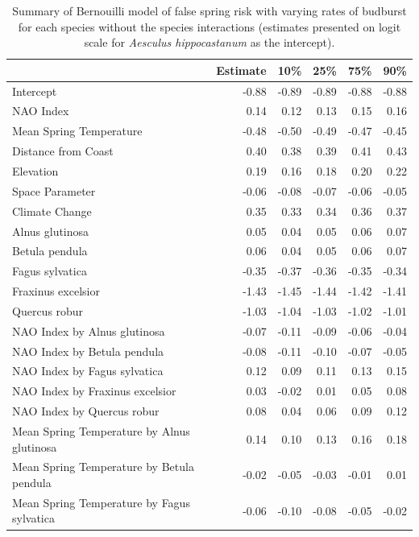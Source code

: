 \documentclass{article}\usepackage[]{graphicx}\usepackage[]{color}
\begin{document}
\begin{longtable}{lrrrrr}
\caption{Summary of Bernouilli model of false spring risk with varying rates of budburst for each species without the species interactions (estimates presented on logit scale for \textit{Aesculus hippocastanum} as the intercept).} \\ 
  \hline
 & Estimate & 10\% & 25\% & 75\% & 90\% \\ 
  \hline \endhead  \hline
Intercept & -0.88 & -0.89 & -0.89 & -0.88 & -0.88 \\ 
  NAO Index & 0.14 & 0.12 & 0.13 & 0.15 & 0.16 \\ 
  Mean Spring 
Temperature & -0.48 & -0.50 & -0.49 & -0.47 & -0.45 \\ 
  Distance from 
Coast & 0.40 & 0.38 & 0.39 & 0.41 & 0.43 \\ 
  Elevation & 0.19 & 0.16 & 0.18 & 0.20 & 0.22 \\ 
  Space Parameter & -0.06 & -0.08 & -0.07 & -0.06 & -0.05 \\ 
  Climate Change & 0.35 & 0.33 & 0.34 & 0.36 & 0.37 \\ 
  Alnus glutinosa & 0.05 & 0.04 & 0.05 & 0.06 & 0.07 \\ 
  Betula pendula & 0.06 & 0.04 & 0.05 & 0.06 & 0.07 \\ 
  Fagus sylvatica & -0.35 & -0.37 & -0.36 & -0.35 & -0.34 \\ 
  Fraxinus excelsior & -1.43 & -1.45 & -1.44 & -1.42 & -1.41 \\ 
  Quercus robur & -1.03 & -1.04 & -1.03 & -1.02 & -1.01 \\ 
  NAO Index
by Alnus glutinosa & -0.07 & -0.11 & -0.09 & -0.06 & -0.04 \\ 
  NAO Index
by Betula pendula & -0.08 & -0.11 & -0.10 & -0.07 & -0.05 \\ 
  NAO Index
by Fagus sylvatica & 0.12 & 0.09 & 0.11 & 0.13 & 0.15 \\ 
  NAO Index
by Fraxinus excelsior & 0.03 & -0.02 & 0.01 & 0.05 & 0.08 \\ 
  NAO Index
by Quercus robur & 0.08 & 0.04 & 0.06 & 0.09 & 0.12 \\ 
  Mean Spring 
Temperature
by Alnus glutinosa & 0.14 & 0.10 & 0.13 & 0.16 & 0.18 \\ 
  Mean Spring 
Temperature
by Betula pendula & -0.02 & -0.05 & -0.03 & -0.01 & 0.01 \\ 
  Mean Spring 
Temperature
by Fagus sylvatica & -0.06 & -0.10 & -0.08 & -0.05 & -0.02 \\ 

\end{longtable}
\end{document}
